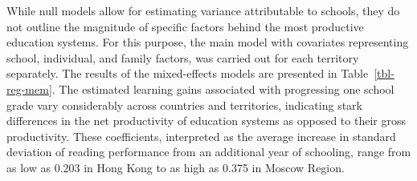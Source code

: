 \documentclass[
]{article}
\begin{document}
While null models allow for estimating variance attributable to schools,
they do not outline the magnitude of specific factors behind the most
productive education systems. For this purpose, the main model with
covariates representing school, individual, and family factors, was
carried out for each territory separately. The results of the
mixed-effects models are presented in Table~\ref{tbl-reg-mem}. The
estimated learning gains associated with progressing one school grade
vary considerably across countries and territories, indicating stark
differences in the net productivity of education systems as opposed to
their gross productivity. These coefficients, interpreted as the average
increase in standard deviation of reading performance from an additional
year of schooling, range from as low as 0.203 in Hong Kong to as high as
0.375 in Moscow Region.
\end{document}
